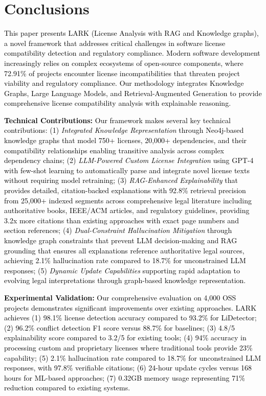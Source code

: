 \section{Conclusions}
\label{Section:Conclusions}

\textcolor{black}{This paper presents LARK (License Analysis with RAG and Knowledge graphs), a novel framework that addresses critical challenges in software license compatibility detection and regulatory compliance. Modern software development increasingly relies on complex ecosystems of open-source components, where 72.91\% of projects encounter license incompatibilities that threaten project viability and regulatory compliance. Our methodology integrates Knowledge Graphs, Large Language Models, and Retrieval-Augmented Generation to provide comprehensive license compatibility analysis with explainable reasoning.

\textbf{Technical Contributions:} Our framework makes several key technical contributions: (1) \textit{Integrated Knowledge Representation} through Neo4j-based knowledge graphs that model 750+ licenses, 20,000+ dependencies, and their compatibility relationships enabling transitive analysis across complex dependency chains; (2) \textit{LLM-Powered Custom License Integration} using GPT-4 with few-shot learning to automatically parse and integrate novel license texts without requiring model retraining; (3) \textit{RAG-Enhanced Explainability} that provides detailed, citation-backed explanations with 92.8\% retrieval precision from 25,000+ indexed segments across comprehensive legal literature including authoritative books, IEEE/ACM articles, and regulatory guidelines, providing 3.2x more citations than existing approaches with exact page numbers and section references; (4) \textit{Dual-Constraint Hallucination Mitigation} through knowledge graph constraints that prevent LLM decision-making and RAG grounding that ensures all explanations reference authoritative legal sources, achieving 2.1\% hallucination rate compared to 18.7\% for unconstrained LLM responses; (5) \textit{Dynamic Update Capabilities} supporting rapid adaptation to evolving legal interpretations through graph-based knowledge representation.

\textbf{Experimental Validation:} Our comprehensive evaluation on 4,000 OSS projects demonstrates significant improvements over existing approaches. LARK achieves (1) 98.1\% license detection accuracy compared to 93.2\% for LiDetector; (2) 96.2\% conflict detection F1 score versus 88.7\% for baselines; (3) 4.8/5 explainability score compared to 3.2/5 for existing tools; (4) 94\% accuracy in processing custom and proprietary licenses where traditional tools provide 23\% capability; (5) 2.1\% hallucination rate compared to 18.7\% for unconstrained LLM responses, with 97.8\% verifiable citations; (6) 24-hour update cycles versus 168 hours for ML-based approaches; (7) 0.32GB memory usage representing 71\% reduction compared to existing systems.

}
